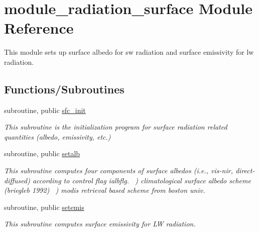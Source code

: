 \hypertarget{namespacemodule__radiation__surface}{}\section{module\+\_\+radiation\+\_\+surface Module Reference}
\label{namespacemodule__radiation__surface}


This module sets up surface albedo for sw radiation and surface emissivity for lw radiation.  


\subsection*{Functions/\+Subroutines}
\begin{DoxyCompactItemize}
\item 
subroutine, public \hyperlink{namespacemodule__radiation__surface_acb6f94d91110828e4c117e3ba0b279a5}{sfc\+\_\+init}                                                                                           
\begin{DoxyCompactList}\small\item\em This subroutine is the initialization program for surface radiation related quantities (albedo, emissivity, etc.) \end{DoxyCompactList}\end{DoxyCompactItemize}
{\bf }\par
\begin{DoxyCompactItemize}
\item 
subroutine, public \hyperlink{namespacemodule__radiation__surface_a79d2feaf2f32435b179ef7bc86ad3f36}{setalb}                                                                                               
\begin{DoxyCompactList}\small\item\em This subroutine computes four components of surface albedos (i.\+e., vis-\/nir, direct-\/diffused) according to control flag ialbflg. ~) climatological surface albedo scheme (briegleb 1992) ~) modis retrieval based scheme from boston univ. \end{DoxyCompactList}\end{DoxyCompactItemize}

{\bf }\par
\begin{DoxyCompactItemize}
\item 
subroutine, public \hyperlink{namespacemodule__radiation__surface_a0fdd0e9a9c536d3d41bd6b6c9d0a8675}{setemis}                                                                                             
\begin{DoxyCompactList}\small\item\em This subroutine computes surface emissivity for LW radiation. \end{DoxyCompactList}\end{DoxyCompactItemize}

